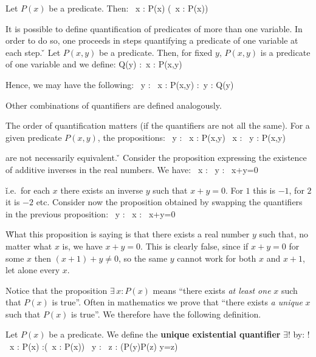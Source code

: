 \bt[]
Let $P(x)$ be a predicate. Then:
\bse
\forall \, x : P(x) \eqv \neg (\exists \, x : \neg P(x))
\ese
\et

It is possible to define quantification of predicates of more than one variable. In order to do so, one proceeds in
steps quantifying a predicate of one variable at each step. \v

\be
Let $P(x,y)$ be a predicate. Then, for fixed $y$, $P(x,y)$ is a predicate of one variable and we define:
\bse
Q(y) :\eqv \forall \, x : P(x,y)
\ese

Hence, we may have the following:
\bse
\exists \, y : \forall \, x : P(x,y) :\eqv \exists \, y : Q(y)
\ese

Other combinations of quantifiers are defined analogously.
\ee

The order of quantification matters (if the quantifiers are not all the same). For a given predicate $P(x,y)$, the
propositions:
\bse
\exists \, y : \forall \, x : P(x,y) \quad {} \quad \forall \, x :
\exists \, y : P(x,y)
\ese

are not necessarily equivalent. \v

\be
Consider the proposition expressing the existence of additive inverses in the real numbers. We have:
\bse
\forall \, x : \exists \, y : \ x+y=0
\ese

\v

i.e.\ for each $x$ there exists an inverse $y$ such that $x+y=0$. For $1$ this is $-1$, for $2$ it is $-2$ etc.
Consider now the proposition obtained by swapping the quantifiers in the previous proposition:
\bse
\exists \, y : \forall \, x : \ x+y=0
\ese

\v

What this proposition is saying is that there exists a real number $y$ such that, no matter what $x$ is, we have
$x+y=0$. This is clearly false, since if $x+y=0$ for some $x$ then $(x+1) +y\neq 0$, so the same $y$ cannot work for
both $x$ and $x+1$, let alone every $x$. \ee

Notice that the proposition $\exists \, x : P(x)$ means ``there exists \emph{at least one} $x$ such that $P(x)$ is
true''. Often in mathematics we prove that ``there exists \emph{a unique} $x$ such that $P(x)$ is true''. We
therefore have the following definition.

Let $P(x)$ be a predicate. We define the \textbf{unique existential quantifier} $\exists !$ by:
\bse
\exists ! \, x : P(x) :\eqv (\exists \, x : P(x)) \land \forall \, y : \forall \, z : (P(y)\land P(z) \imp y=z)
\ese
\ed

